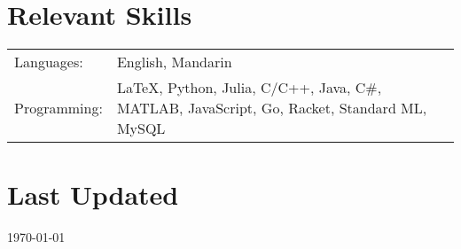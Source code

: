 \documentclass[margin,line]{res}
\newenvironment{list2}{
  \begin{list}{$\bullet$}{%
      \setlength{\itemsep}{0in}
      \setlength{\parsep}{0in} \setlength{\parskip}{0in}
      \setlength{\topsep}{0in} \setlength{\partopsep}{0in}
      \setlength{\leftmargin}{0.2in}}}{\end{list}}
\begin{document}
\begin{resume}



\section{\sc Relevant Skills}

\vspace{.05in}
\begin{tabular}{@{}p{0.8in}p{4.25in}}

Languages:& English, Mandarin \\
Programming:& \LaTeX, Python, Julia, C/C++, Java, C\#, MATLAB, JavaScript, Go, Racket, Standard ML, MySQL

\end{tabular}


\section{\sc Last Updated}
\today


\end{resume}
\end{document}
